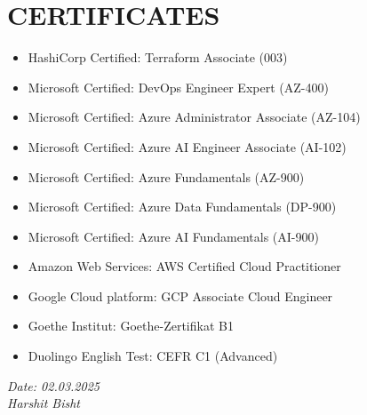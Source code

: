 \documentclass[11pt,a4paper]{article}
\begin{document}
\section*{CERTIFICATES}
\begin{itemize}
    \item HashiCorp Certified: Terraform Associate (003)
    \item Microsoft Certified: DevOps Engineer Expert (AZ-400)
    \item Microsoft Certified: Azure Administrator Associate (AZ-104)
    \item Microsoft Certified: Azure AI Engineer Associate (AI-102)
    \item Microsoft Certified: Azure Fundamentals (AZ-900)
    \item Microsoft Certified: Azure Data Fundamentals (DP-900)
    \item Microsoft Certified: Azure AI Fundamentals (AI-900)
    \item Amazon Web Services: AWS Certified Cloud Practitioner
    \item Google Cloud platform: GCP Associate Cloud Engineer
    \item Goethe Institut: Goethe-Zertifikat B1
    \item Duolingo English Test: CEFR C1 (Advanced)
\end{itemize}


\vfill %
\noindent %
\begin{flushright} %
    \textit{Date: 02.03.2025}\\ %
    \textit{Harshit Bisht} %
\end{flushright}
\end{document}
